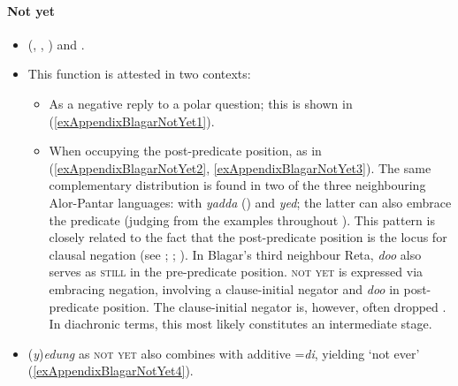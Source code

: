 \paragraph{Not yet}
\label{appendixBlagarNotYet}
\begin{itemize}
	\item  \citeauthor{Steinhauer1995} (\citeyear[281]{Steinhauer1995}, \citeyear[174]{SteinhauerBlagar}, \citeyear[153]{SteinhauerBukalabang}) and \textcite[175, 285]{SteinhauerGomang2016}.
	\item This function is attested in two contexts:
	\begin{itemize}
		\item As a negative reply to a polar question; this is shown in (\ref{exAppendixBlagarNotYet1}).
		\item When occupying the post-predicate position, as in (\ref{exAppendixBlagarNotYet2}, \ref{exAppendixBlagarNotYet3}). The same complementary distribution is found in two of the three neighbouring Alor-Pantar languages: with  \textit{yadda} (\cite[84–85]{Schapper2014Nedebang}) and  \textit{yed}; the latter can also embrace the predicate (judging from the examples throughout \cite{Klamer2010}). This pattern is closely related to the fact that the post-predicate position is the locus for clausal negation (see \cite[165]{SteinhauerBlagar}; \cite[273–275]{Klamer2010}; \cite[83–84]{Schapper2014Nedebang}). In Blagar's third neighbour Reta, \textit{doo} also serves as \textsc{still} in the pre-predicate position. \textsc{not yet} is expressed via embracing negation, involving a clause-initial negator and \textit{doo} in post-predicate position. The clause-initial negator is, however, often dropped \parencite[212]{Willemsen2020}. In diachronic terms, this most likely constitutes an intermediate stage.
	\end{itemize}
	\item (\textit{y})\textit{edung} as \textsc{not yet} also combines with additive \mbox{=\textit{di}}, yielding \lq not ever' (\ref{exAppendixBlagarNotYet4}).
\end{itemize}

